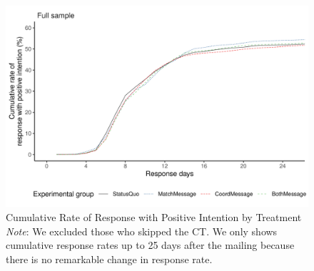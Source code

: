 \documentclass[12pt, a4paper]{article}
\begin{document}
\begin{figure}[H]
\includegraphics{JMDP RCT - Online Supplementary Material_files/figure-latex/cumulative-response-1} \caption{Cumulative Rate of Response with Positive Intention by Treatment \newline \emph{Note}: We excluded those who skipped the CT. We only shows cumulative response rates up to 25 days after the mailing because there is no remarkable change in response rate.}\label{fig:cumulative-response}
\end{figure}

\clearpage
\end{document}
